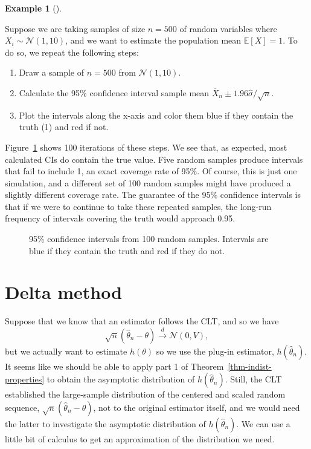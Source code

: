 \documentclass[
  13pt,
  letterpaper,
  DIV=11,
  numbers=noendperiod]{scrreprt}
\providecommand{\tightlist}{%
  \setlength{\itemsep}{0pt}\setlength{\parskip}{0pt}}\usepackage{longtable,booktabs,array}
\newcommand{\E}{\mathbb{E}}
\newcommand{\N}{\mathcal{N}}
\newcommand{\Xbar}{\overline{X}}
\newcommand{\indist}{\overset{d}{\to}}
\theoremstyle{plain}
\theoremstyle{definition}
\newtheorem{example}{Example}[chapter]
\theoremstyle{definition}
\theoremstyle{remark}
\begin{document}
\begin{example}[]\protect\hypertarget{exm-cis}{}\label{exm-cis}

Suppose we are taking samples of size \(n=500\) of random variables
where \(X_i \sim \N(1, 10)\), and we want to estimate the population
mean \(\E[X] = 1\). To do so, we repeat the following steps:

\begin{enumerate}
\def\labelenumi{\arabic{enumi}.}
\tightlist
\item
  Draw a sample of \(n=500\) from \(\N(1, 10)\).
\item
  Calculate the 95\% confidence interval sample mean
  \(\Xbar_n \pm 1.96\widehat{\sigma}/\sqrt{n}\).
\item
  Plot the intervals along the x-axis and color them blue if they
  contain the truth (1) and red if not.
\end{enumerate}

Figure~\ref{fig-ci-sim} shows 100 iterations of these steps. We see
that, as expected, most calculated CIs do contain the true value. Five
random samples produce intervals that fail to include 1, an exact
coverage rate of 95\%. Of course, this is just one simulation, and a
different set of 100 random samples might have produced a slightly
different coverage rate. The guarantee of the 95\% confidence intervals
is that if we were to continue to take these repeated samples, the
long-run frequency of intervals covering the truth would approach 0.95.

\begin{figure}[th]


\caption{\label{fig-ci-sim}95\% confidence intervals from 100 random
samples. Intervals are blue if they contain the truth and red if they do
not.}

\end{figure}%

\end{example}

\section{Delta method}\label{sec-delta-method}

Suppose that we know that an estimator follows the CLT, and so we have
\[
\sqrt{n}\left(\widehat{\theta}_n - \theta \right) \indist \N(0, V),
\] but we actually want to estimate \(h(\theta)\) so we use the plug-in
estimator, \(h(\widehat{\theta}_n)\). It seems like we should be able to
apply part 1 of Theorem~\ref{thm-indist-properties} to obtain the
asymptotic distribution of \(h(\widehat{\theta}_n)\). Still, the CLT
established the large-sample distribution of the centered and scaled
random sequence, \(\sqrt{n}(\widehat{\theta}_n - \theta)\), not to the
original estimator itself, and we would need the latter to investigate
the asymptotic distribution of \(h(\widehat{\theta}_n)\). We can use a
little bit of calculus to get an approximation of the distribution we
need.
\end{document}
